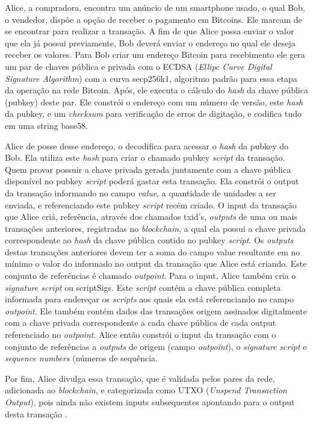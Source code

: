 \documentclass[
	article,			%
	11pt,				%
	oneside,			%
	a4paper,			%
	chapter=TITLE,		%
	section=TITLE,		%
	subsection=TITLE,	%
	subsubsection=TITLE, %
	english,			%
	brazil,				%
	sumario=tradicional
	]{ifrs-artigo-abntex2}
\begin{document}
Alice, a compradora, encontra um anúncio de um smartphone usado, o qual Bob, o vendedor, dispõe a opção de receber o pagamento em Bitcoins. Ele marcam de se encontrar para realizar a transação.
A fim de que Alice possa enviar o valor que ela já possui previamente, Bob deverá enviar o endereço no qual ele deseja receber os valores.
Para Bob criar um endereço Bitcoin para recebimento ele gera um par de chaves pública e privada com o ECDSA (\textit{Ellipc Curve Digital Signature Algorithm})  com a curva secp256k1, algoritmo padrão para essa etapa da operação na rede Bitcoin. Após, ele executa o cálculo do \textit{hash} da chave pública (pubkey) deste par. Ele constrói o endereço com um número de versão, este \textit{hash} da pubkey, e um \textit{checksum} para verificação de erros de digitação, e codifica tudo em uma string base58.

Alice de posse desse endereço, o decodifica para acessar o \textit{hash} da pubkey do Bob. Ela utiliza este \textit{hash} para criar o chamado pubkey \textit{script} da transação. Quem provar possuir a chave privada gerada juntamente com a chave pública disponível no pubkey \textit{script} poderá gastar esta transação. Ela constrói o output da transação informando no campo \textit{value}, a quantidade de unidades a ser enviada, e referenciando este pubkey \textit{script} recém criado.
O input da transação que Alice criá, referência, através dos chamados txid’s, \textit{outputs} de uma ou mais transações anteriores, registradas no \textit{blockchain}, a qual ela possui a chave privada correspondente ao \textit{hash} da chave pública contido no pubkey \textit{script}. Os \textit{outputs} destas transações anteriores devem ter a soma do campo value resultante em no mínimo o valor do informado no output da transação que Alice está criando. Este conjunto de referências é chamado \textit{outpoint}.
Para o input, Alice também cria o \textit{signature script} ou scriptSigs. Este \textit{script} contém a chave pública completa informada para endereçar os \textit{scripts} aos quais ela está referenciando no campo \textit{outpoint}. Ele também contém dados das transações origem assinados digitalmente com a chave privada correspondente a cada chave pública de cada output referenciado no \textit{outpoint}.
Alice então constrói o input da transação com o conjunto de referências a \textit{outputs} de origem (campo \textit{outpoint}), o \textit{signature script} e \textit{sequence numbers} (números de sequência.

Por fim, Alice divulga essa transação, que é validada pelos pares da rede, adicionada ao \textit{blockchain}, e categorizada como UTXO (\textit{Unspend Transaction Output}), pois ainda não existem inputs subsequentes apontando para o output desta transação \cite{bitcoinDev}.
\end{document}
